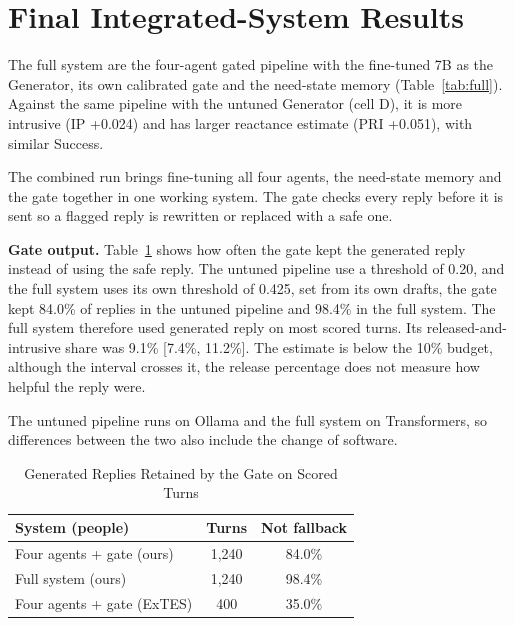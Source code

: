 \documentclass[journal]{IEEEtran}
\newcommand{\tsize}{\footnotesize}
\begin{document}
\section{Final Integrated-System Results}\label{sec:r-full}
The full system are the four-agent gated pipeline with the fine-tuned 7B as the Generator, its own calibrated gate and the need-state memory (Table~\ref{tab:full}). Against the same pipeline with the untuned Generator (cell D), it is more intrusive (IP +0.024) and has larger reactance estimate (PRI +0.051), with similar Success.

The combined run brings fine-tuning all four agents, the need-state memory and the gate together in one working system. The gate checks every reply before it is sent so a flagged reply is rewritten or replaced with a safe one.

\textbf{Gate output.} Table~\ref{tab:viols} shows how often the gate kept the generated reply instead of using the safe reply. The untuned pipeline use a threshold of 0.20, and the full system uses its own threshold of 0.425, set from its own drafts, the gate kept 84.0\% of replies in the untuned pipeline and 98.4\% in the full system. The full system therefore used generated reply on most scored turns. Its released-and-intrusive share was 9.1\% [7.4\%, 11.2\%]. The estimate is below the 10\% budget, although the interval crosses it, the release percentage does not measure how helpful the reply were.

The untuned pipeline runs on Ollama and the full system on Transformers, so differences between the two also include the change of software.

\begin{table}[!htb]
\caption{Generated Replies Retained by the Gate on Scored Turns}
\label{tab:viols}
\centering\tsize\setlength{\tabcolsep}{5.4pt}
\begin{tabular}{@{}lcc@{}}
\toprule
System (people) & Turns & Not fallback\\
\midrule
Four agents + gate (ours) & 1,240 & 84.0\%\\
Full system (ours) & 1,240 & 98.4\%\\
Four agents + gate (ExTES) & 400 & 35.0\%\\
\bottomrule
\end{tabular}
\end{table}
\end{document}

